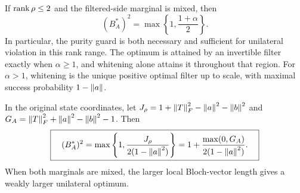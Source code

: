 \begin{theorem}
\label{cor:ext-low-rank}
If $\operatorname{rank}\rho\le2$ and the filtered-side marginal is mixed, then
\begin{equation}
 \boxed{\quad
 (B_A^*)^2=\max\left\{1,\frac{1+\alpha}{2}\right\}.
 \quad}
 \label{eq:ext-low-rank}
\end{equation}
In particular, the purity guard is both necessary and sufficient for
unilateral violation in this rank range.
The optimum is attained by an invertible filter exactly when
$\alpha\ge1$, and whitening alone attains it throughout that region.
For $\alpha>1$, whitening is the unique positive optimal filter up to
scale, with maximal success probability $1-\left\lVert a\right\rVert$.

In the original state coordinates, let
$J_\rho=1+\left\lVert T\right\rVert_F^2-\left\lVert a\right\rVert^2-\left\lVert b\right\rVert^2$ and
$G_A=\left\lVert T\right\rVert_F^2+\left\lVert a\right\rVert^2-\left\lVert b\right\rVert^2-1$. Then
\begin{equation}
 \boxed{\quad
 (B_A^*)^2
 =\max\left\{1,\frac{J_\rho}{2(1-\left\lVert a\right\rVert^2)}\right\}
 =1+\frac{\max(0,G_A)}{2(1-\left\lVert a\right\rVert^2)}.
 \quad}
 \label{eq:ext-low-rank-raw}
\end{equation}
When both marginals are mixed, the larger local Bloch-vector length
gives a weakly larger unilateral optimum.
\end{theorem}

